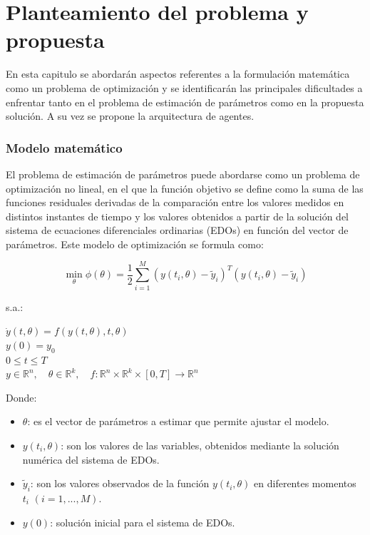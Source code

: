 \chapter{Planteamiento del problema y propuesta}\label{chapter:proposal}

\label{sec:14}

        En esta capitulo se abordarán aspectos referentes a la formulación matemática como un problema de optimización y se identificarán las principales dificultades a enfrentar tanto en el problema de estimación de parámetros como en la propuesta solución. A su vez se propone la arquitectura de agentes.

        \subsection*{ Modelo matemático}

        El problema de estimación de parámetros puede abordarse como un problema de optimización no lineal, en el que la función objetivo se define como la suma de las funciones residuales derivadas de la comparación entre los valores medidos en distintos instantes de tiempo y los valores obtenidos a partir de la solución del sistema de ecuaciones diferenciales ordinarias (EDOs) en función del vector de parámetros. Este modelo de optimización se formula como:

    \begin{equation}
        \min_{\theta} \phi(\theta) = \frac{1}{2} \sum_{i=1}^{M} (y(t_i, \theta) - \tilde{y}_i)^T (y(t_i,    \theta) - \tilde{y}_i)
    \end{equation}

    s.a.:


        \begin{center}

        $\dot{y}(t, \theta) = f(y(t, \theta), t, \theta)$ \\
        $y(0) = y_0$ \\
        $0 \leq t \leq T$ \\
        $y \in \mathbb{R}^n, \quad \theta \in \mathbb{R}^k, \quad f : \mathbb{R}^n \times \mathbb{R}^k \times [0, T] \rightarrow \mathbb{R}^n$

        \end{center}

    Donde:
    \begin{itemize}
        \item $\theta$: es el vector de parámetros a estimar que permite ajustar el modelo.
        \item $y(t_i, \theta)$: son los valores de las variables, obtenidos mediante la solución numérica del sistema de EDOs.
        \item $\tilde{y}_i$: son los valores observados de la función $y(t_i, \theta)$ en diferentes momentos $t_i$ $(i = 1, ..., M)$.
        \item $y(0)$: solución inicial para el sistema de EDOs.
    \end{itemize}

